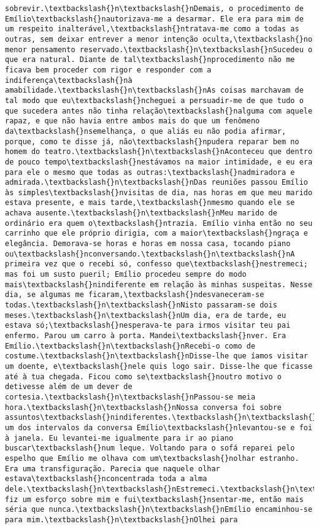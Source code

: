 \begin{Verbatim}[commandchars=\\\{\}]
sobrevir.\textbackslash{}n\textbackslash{}nDemais, o procedimento de Emílio\textbackslash{}nautorizava-me a desarmar. Ele era para mim de um respeito inalterável,\textbackslash{}ntratava-me como a todas as outras, sem deixar entrever a menor intenção oculta,\textbackslash{}no menor pensamento reservado.\textbackslash{}n\textbackslash{}nSucedeu o que era natural. Diante de tal\textbackslash{}nprocedimento não me ficava bem proceder com rigor e responder com a indiferença\textbackslash{}nà amabilidade.\textbackslash{}n\textbackslash{}nAs coisas marchavam de tal modo que eu\textbackslash{}ncheguei a persuadir-me de que tudo o que sucedera antes não tinha relação\textbackslash{}nalguma com aquele rapaz, e que não havia entre ambos mais do que um fenômeno da\textbackslash{}nsemelhança, o que aliás eu não podia afirmar, porque, como te disse já, não\textbackslash{}npudera reparar bem no homem do teatro.\textbackslash{}n\textbackslash{}nAconteceu que dentro de pouco tempo\textbackslash{}nestávamos na maior intimidade, e eu era para ele o mesmo que todas as outras:\textbackslash{}nadmiradora e admirada.\textbackslash{}n\textbackslash{}nDas reuniões passou Emílio às simples\textbackslash{}nvisitas de dia, nas horas em que meu marido estava presente, e mais tarde,\textbackslash{}nmesmo quando ele se achava ausente.\textbackslash{}n\textbackslash{}nMeu marido de ordinário era quem o\textbackslash{}ntrazia. Emílio vinha então no seu carrinho que ele próprio dirigia, com a maior\textbackslash{}ngraça e elegância. Demorava-se horas e horas em nossa casa, tocando piano ou\textbackslash{}nconversando.\textbackslash{}n\textbackslash{}nA primeira vez que o recebi só, confesso que\textbackslash{}nestremeci; mas foi um susto pueril; Emílio procedeu sempre do modo mais\textbackslash{}nindiferente em relação às minhas suspeitas. Nesse dia, se algumas me ficaram,\textbackslash{}ndesvaneceram-se todas.\textbackslash{}n\textbackslash{}nNisto passaram-se dois meses.\textbackslash{}n\textbackslash{}nUm dia, era de tarde, eu estava só;\textbackslash{}nesperava-te para irmos visitar teu pai enfermo. Parou um carro à porta. Mandei\textbackslash{}nver. Era Emílio.\textbackslash{}n\textbackslash{}nRecebi-o como de costume.\textbackslash{}n\textbackslash{}nDisse-lhe que íamos visitar um doente, e\textbackslash{}nele quis logo sair. Disse-lhe que ficasse até à tua chegada. Ficou como se\textbackslash{}noutro motivo o detivesse além de um dever de cortesia.\textbackslash{}n\textbackslash{}nPassou-se meia hora.\textbackslash{}n\textbackslash{}nNossa conversa foi sobre assuntos\textbackslash{}nindiferentes.\textbackslash{}n\textbackslash{}nEm um dos intervalos da conversa Emílio\textbackslash{}nlevantou-se e foi à janela. Eu levantei-me igualmente para ir ao piano buscar\textbackslash{}num leque. Voltando para o sofá reparei pelo espelho que Emílio me olhava com um\textbackslash{}nolhar estranho. Era uma transfiguração. Parecia que naquele olhar estava\textbackslash{}nconcentrada toda a alma dele.\textbackslash{}n\textbackslash{}nEstremeci.\textbackslash{}n\textbackslash{}nTodavia fiz um esforço sobre mim e fui\textbackslash{}nsentar-me, então mais séria que nunca.\textbackslash{}n\textbackslash{}nEmílio encaminhou-se para mim.\textbackslash{}n\textbackslash{}nOlhei para 
\end{Verbatim}
